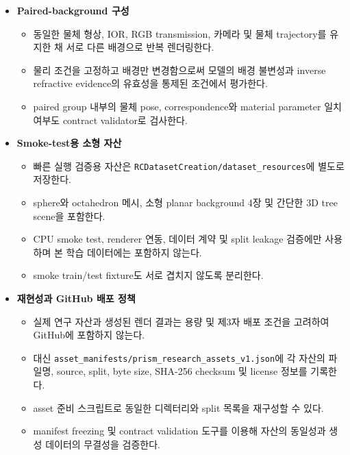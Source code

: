 \begin{itemize}
    \item \textbf{Paired-background 구성}
    \begin{itemize}
        \item 동일한 물체 형상, IOR, RGB transmission, 카메라 및 물체
        trajectory를 유지한 채 서로 다른 배경으로 반복 렌더링한다.
        \item 물리 조건을 고정하고 배경만 변경함으로써 모델의 배경 불변성과
        inverse refractive evidence의 유효성을 통제된 조건에서 평가한다.
        \item paired group 내부의 물체 pose, correspondence와 material
        parameter 일치 여부도 contract validator로 검사한다.
    \end{itemize}

    \item \textbf{Smoke-test용 소형 자산}
    \begin{itemize}
        \item 빠른 실행 검증용 자산은
        \texttt{RCDatasetCreation/dataset\_resources}에 별도로 저장한다.
        \item sphere와 octahedron 메시, 소형 planar background 4장 및 간단한
        3D tree scene을 포함한다.
        \item CPU smoke test, renderer 연동, 데이터 계약 및 split leakage
        검증에만 사용하며 본 학습 데이터에는 포함하지 않는다.
        \item smoke train/test fixture도 서로 겹치지 않도록 분리한다.
    \end{itemize}

    \item \textbf{재현성과 GitHub 배포 정책}
    \begin{itemize}
        \item 실제 연구 자산과 생성된 렌더 결과는 용량 및 제3자 배포 조건을
        고려하여 GitHub에 포함하지 않는다.
        \item 대신
        \texttt{asset\_manifests/prism\_research\_assets\_v1.json}에 각
        자산의 파일명, source, split, byte size, SHA-256 checksum 및
        license 정보를 기록한다.
        \item asset 준비 스크립트로 동일한 디렉터리와 split 목록을 재구성할
        수 있다.
        \item manifest freezing 및 contract validation 도구를 이용해 자산의
        동일성과 생성 데이터의 무결성을 검증한다.
    \end{itemize}
\end{itemize}
